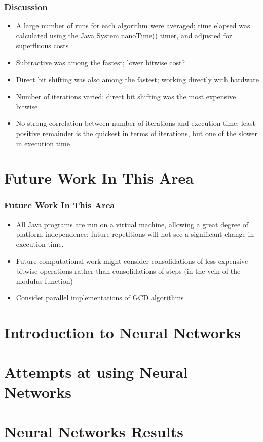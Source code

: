 \documentclass{beamer}
\begin{document}
\begin{frame}
\frametitle{Discussion}
\begin{itemize}
\item A large number of runs for each algorithm were averaged; time elapsed was calculated using the Java System.nanoTime() timer, and adjusted for superfluous costs 
\item Subtractive was among the fastest; lower bitwise cost?
\item Direct bit shifting was also among the fastest; working directly with hardware
\item Number of iterations varied: direct bit shifting was the most expensive bitwise
\item No strong correlation between number of iterations and execution time: least positive remainder is the quickest in terms of iterations, but one of the slower in execution time
\end{itemize}
\end{frame}

\section{Future Work In This Area}
\begin{frame}
\frametitle{Future Work In This Area}
\begin{itemize}
\item All Java programs are run on a virtual machine, allowing a great degree of platform independence; future repetitions will not see a significant change in execution time.
\item Future computational work might consider consolidations of less-expensive bitwise operations rather than consolidations of steps (in the vein of the modulus function)
\item Consider parallel implementations of GCD algorithms
\end{itemize}
\end{frame}
\section{Introduction to Neural Networks}

\section{Attempts at using Neural Networks}

\section{Neural Networks Results}
\end{document}
